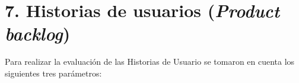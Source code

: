 \documentclass[
11pt, %
]{charter}
\begin{document}
%
%
%
%
%
%

\section{7. Historias de usuarios (\textit{Product backlog})}
\label{sec:backlog}

Para realizar la evaluación de las Historias de Usuario se tomaron en cuenta los siguientes tres parámetros: 
\end{document}
